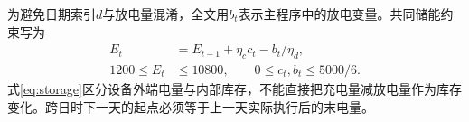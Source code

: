 为避免日期索引$d$与放电量混淆，全文用$b_t$表示主程序中的放电变量。共同储能约束写为
\begin{align}
E_t&=E_{t-1}+\eta_c c_t-b_t/\eta_d,\label{eq:storage}\\
1200\le E_t&\le10800,\qquad 0\le c_t,b_t\le5000/6.\label{eq:bounds}
\end{align}
式\eqref{eq:storage}区分设备外端电量与内部库存，不能直接把充电量减放电量作为库存变化。跨日时下一天的起点必须等于上一天实际执行后的末电量。
